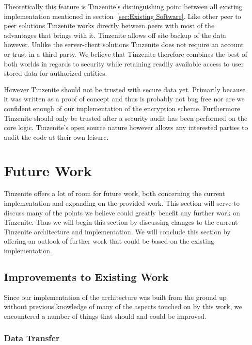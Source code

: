 Theoretically this feature is Tinzenite's distinguishing point between all existing implementation mentioned in section~\ref{sec:Existing Software}.
Like other peer to peer solutions Tinzenite works directly between peers with most of the advantages that brings with it.
Tinzenite allows off site backup of the data however.
Unlike the server-client solutions Tinzenite does not require an account or trust in a third party.
We believe that Tinzenite therefore combines the best of both worlds in regards to security while retaining readily available access to user stored data for authorized entities.

However Tinzenite should not be trusted with secure data yet.
Primarily because it was written as a proof of concept and thus is probably not bug free nor are we confident enough of our implementation of the encryption scheme.
Furthermore Tinzenite should only be trusted after a security audit has been performed on the core logic.
Tinzenite's open source nature however allows any interested parties to audit the code at their own leisure.

\section{Future Work}
\label{sec:Future Work}

Tinzenite offers a lot of room for future work, both concerning the current implementation and expanding on the provided work.
This section will serve to discuss many of the points we believe could greatly benefit any further work on Tinzenite.
Thus we will begin this section by discussing changes to the current Tinzenite architecture and implementation.
We will conclude this section by offering an outlook of further work that could be based on the existing implementation.

\subsection{Improvements to Existing Work}
\label{sub:Improvements to Existing Work}

Since our implementation of the architecture was built from the ground up without previous knowledge of many of the aspects touched on by this work, we encountered a number of things that should and could be improved.

\subsubsection{Data Transfer}
\label{subs:Data Transfer}

